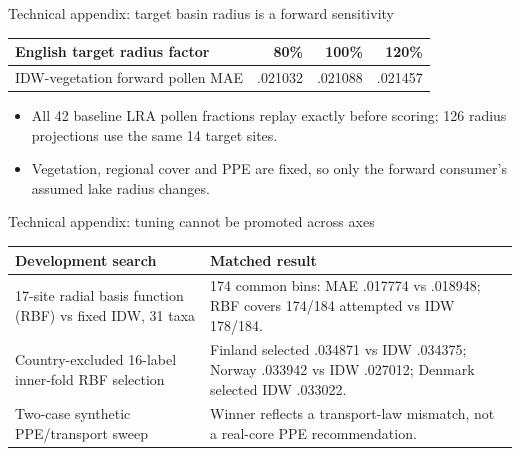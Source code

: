 \begin{frame}{Technical appendix: target basin radius is a forward sensitivity}
\small
\begin{tabular}{lrrr}
\toprule
English target radius factor & 80\% & 100\% & 120\% \\
\midrule
IDW-vegetation forward pollen MAE & .021032 & .021088 & .021457 \\
\bottomrule
\end{tabular}
\begin{itemize}
\item All 42 baseline LRA pollen fractions replay exactly before scoring; 126 radius projections use the same 14 target sites.
\item Vegetation, regional cover and PPE are fixed, so only the forward consumer's assumed lake radius changes.
\end{itemize}
\end{frame}

\begin{frame}{Technical appendix: tuning cannot be promoted across axes}
\scriptsize
\begin{tabular}{p{}p{}}
\toprule
Development search & Matched result \\
\midrule
17-site radial basis function (RBF) vs fixed IDW, 31 taxa & 174 common bins: MAE .017774 vs .018948; RBF covers 174/184 attempted vs IDW 178/184. \\
Country-excluded 16-label inner-fold RBF selection & Finland selected .034871 vs IDW .034375; Norway .033942 vs IDW .027012; Denmark selected IDW .033022. \\
Two-case synthetic PPE/transport sweep & Winner reflects a transport-law mismatch, not a real-core PPE recommendation. \\
\bottomrule
\end{tabular}
\end{frame}

